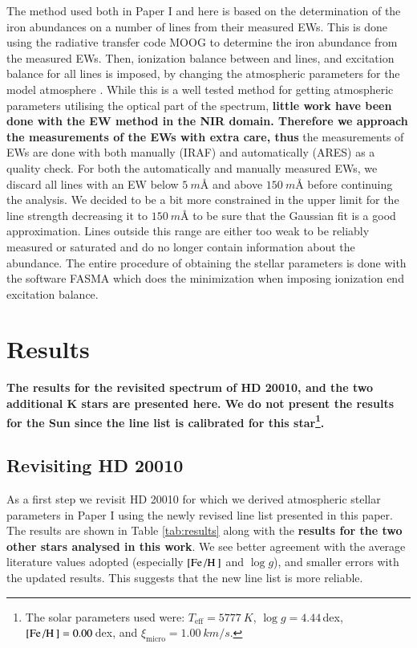 \documentclass{aa}
\begin{document}
The method used both in Paper I and here is based on the determination of the iron abundances
on a number of lines from their measured EWs. This is done using the radiative transfer code MOOG
\citep{Sneden1973} to determine the iron abundance from the measured EWs. Then, ionization balance
between  and  lines, and excitation balance for all  lines is
imposed, by changing the atmospheric parameters for the model atmosphere \citep[][ATLAS9 is used
here]{Kurucz1993}. While this is a well tested method for getting atmospheric parameters utilising
the optical part of the spectrum, {\bf little work have been done with the EW method in the NIR
domain. Therefore we approach the measurements of the EWs with extra care, thus} the measurements of
EWs are done with both manually (IRAF) and automatically (ARES) as a quality check. For both the
automatically and manually measured EWs, we discard all lines with an EW below $\SI{5}{m}$\AA{} and
above $\SI{150}{m}$\AA{} before continuing the analysis. We decided to be a bit more constrained in
the upper limit for the line strength decreasing it to $\SI{150}{m}$\AA{} to be sure that the
Gaussian fit is a good approximation. Lines outside this range are either too weak to be reliably
measured or saturated and do no longer contain information about the abundance. The entire procedure
of obtaining the stellar parameters is done with the software FASMA \citep{Andreasen2017a} which
does the minimization when imposing ionization end excitation balance.




\section{Results}
\label{sec:results}

{\bf The results for the revisited spectrum of HD 20010, and the two additional K stars are
presented here. We do not present the results for the Sun since the line list is calibrated for this
star\footnote{The solar parameters used were: $T_\mathrm{eff}=\SI{5777}{K}$, $\log g=4.44\,$dex,
$[\ion{Fe}/\ion{H}]=0.00\,$dex, and $\xi_\mathrm{micro}=\SI{1.00}{km/s}$.}.}

\subsection{Revisiting HD 20010}
\label{sec:hd20010}

As a first step we revisit HD 20010 for which we derived atmospheric stellar
parameters in Paper I using the newly revised line list presented in this paper.
The results are shown in Table \ref{tab:results} along with the {\bf results for
the two other stars analysed in this work}. We see better agreement with the
average literature values adopted (especially $[\ion{Fe}/\ion{H}]$ and $\log g$),
and smaller errors with the updated results. This suggests that the new line
list is more reliable.
\end{document}
